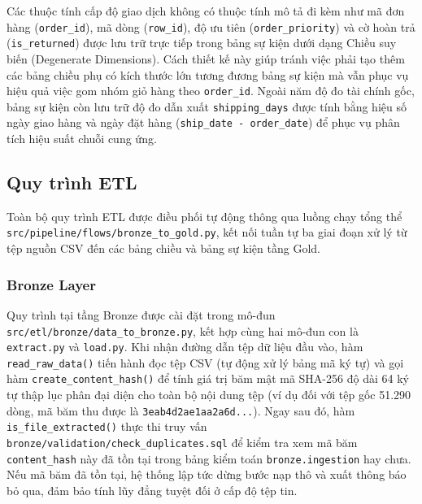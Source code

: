 Các thuộc tính cấp độ giao dịch không có thuộc tính mô tả đi kèm như mã đơn hàng (\texttt{order\_id}), mã dòng (\texttt{row\_id}), độ ưu tiên (\texttt{order\_priority}) và cờ hoàn trả (\texttt{is\_returned}) được lưu trữ trực tiếp trong bảng sự kiện dưới dạng Chiều suy biến (Degenerate Dimensions). Cách thiết kế này giúp tránh việc phải tạo thêm các bảng chiều phụ có kích thước lớn tương đương bảng sự kiện mà vẫn phục vụ hiệu quả việc gom nhóm giỏ hàng theo \texttt{order\_id}. Ngoài năm độ đo tài chính gốc, bảng sự kiện còn lưu trữ độ đo dẫn xuất \texttt{shipping\_days} được tính bằng hiệu số ngày giao hàng và ngày đặt hàng (\texttt{ship\_date - order\_date}) để phục vụ phân tích hiệu suất chuỗi cung ứng.

\subsection{Quy trình ETL}

Toàn bộ quy trình ETL được điều phối tự động thông qua luồng chạy tổng thể \texttt{src/pipeline/flows/bronze\_to\_gold.py}, kết nối tuần tự ba giai đoạn xử lý từ tệp nguồn CSV đến các bảng chiều và bảng sự kiện tầng Gold.

\subsubsection{Bronze Layer}

Quy trình tại tầng Bronze được cài đặt trong mô-đun \texttt{src/etl/bronze/data\_to\_bronze.py}, kết hợp cùng hai mô-đun con là \texttt{extract.py} và \texttt{load.py}. Khi nhận đường dẫn tệp dữ liệu đầu vào, hàm \texttt{read\_raw\_data()} tiến hành đọc tệp CSV (tự động xử lý bảng mã ký tự) và gọi hàm \texttt{create\_content\_hash()} để tính giá trị băm mật mã SHA-256 độ dài 64 ký tự thập lục phân đại diện cho toàn bộ nội dung tệp (ví dụ đối với tệp gốc 51.290 dòng, mã băm thu được là \texttt{3eab4d2ae1aa2a6d...}). Ngay sau đó, hàm \texttt{is\_file\_extracted()} thực thi truy vấn \texttt{bronze/validation/check\_duplicates.sql} để kiểm tra xem mã băm \texttt{content\_hash} này đã tồn tại trong bảng kiểm toán \texttt{bronze.ingestion} hay chưa. Nếu mã băm đã tồn tại, hệ thống lập tức dừng bước nạp thô và xuất thông báo bỏ qua, đảm bảo tính lũy đẳng tuyệt đối ở cấp độ tệp tin.

